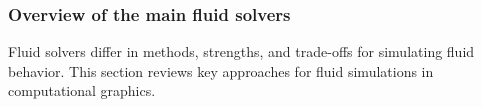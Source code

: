







\subsubsection{Overview of the main fluid solvers}
Fluid solvers differ in methods, strengths, and trade-offs for simulating fluid behavior. This section reviews key approaches for fluid simulations in computational graphics.

